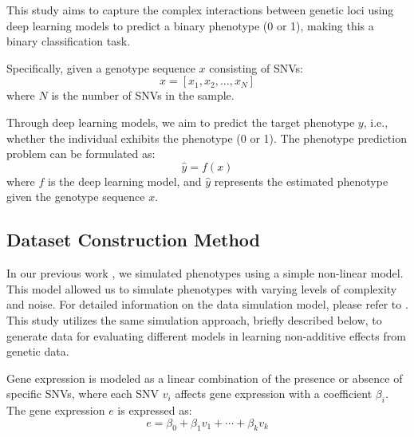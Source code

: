 \documentclass{article}
\begin{document}
This study aims to capture the complex interactions between genetic loci using deep learning models to predict a binary phenotype (0 or 1), making this a binary classification task.

Specifically, given a genotype sequence \( x \) consisting of SNVs:
\begin{equation}
x = [x_1, x_2, \dots, x_N]
\end{equation}
where \( N \) is the number of SNVs in the sample.

Through deep learning models, we aim to predict the target phenotype \( y \), i.e., whether the individual exhibits the phenotype (0 or 1). The phenotype prediction problem can be formulated as:
\begin{equation}
\hat{y} = f(x)
\end{equation}
where \( f \) is the deep learning model, and \( \hat{y} \) represents the estimated phenotype given the genotype sequence \( x \).



\subsection{Dataset Construction Method}
\label{sec:dataset-construction}
In our previous work \parencite{kieransimulatepaper}, we simulated phenotypes using a simple non-linear model. This model allowed us to simulate phenotypes with varying levels of complexity and noise. For detailed information on the data simulation model, please refer to \parencite{kieransimulatepaper}. This study utilizes the same simulation approach, briefly described below, to generate data for evaluating different models in learning non-additive effects from genetic data.


Gene expression is modeled as a linear combination of the presence or absence of specific SNVs, where each SNV \( v_i \) affects gene expression with a coefficient \( \beta_i \). The gene expression \( e \) is expressed as:
\begin{equation}
e = \beta_0 + \beta_1 v_1 + \cdots + \beta_k v_k
\end{equation}
\end{document}
